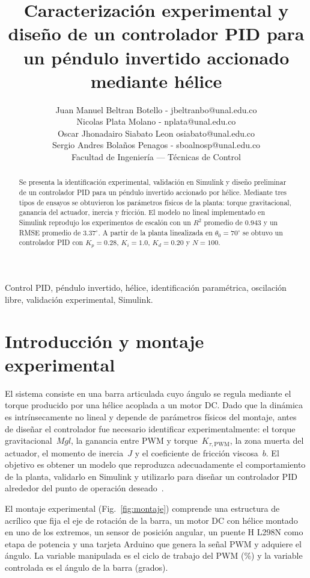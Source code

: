 \documentclass[journal, 10pt, twocolumn]{IEEEtran}
\title{Caracterización experimental y diseño de un controlador PID para
       un péndulo invertido accionado mediante hélice}
\author{Juan Manuel Beltran Botello - jbeltranbo@unal.edu.co\\
		Nicolas Plata Molano - nplata@unal.edu.co\\
		Oscar Jhonadairo Siabato Leon osiabato@unal.edu.co\\
	    Sergio Andres Bolaños Penagos - sboalnosp@unal.edu.co\\
        Facultad de Ingeniería --- Técnicas de Control}
\begin{document}
\maketitle

\begin{abstract}
Se presenta la identificación experimental, validación en Simulink y diseño
preliminar de un controlador PID para un péndulo invertido accionado por
hélice. Mediante tres tipos de ensayos se obtuvieron los parámetros físicos
de la planta: torque gravitacional, ganancia del actuador, inercia y fricción.
El modelo no lineal implementado en Simulink reprodujo los experimentos de
escalón con un $R^2$ promedio de $0.943$ y un RMSE promedio de $3.37^\circ$.
A partir de la planta linealizada en $\theta_0=70^\circ$ se obtuvo un
controlador PID con $K_p=0.28$, $K_i=1.0$, $K_d=0.20$ y $N=100$.
\end{abstract}

\begin{IEEEkeywords}
Control PID, péndulo invertido, hélice, identificación paramétrica,
oscilación libre, validación experimental, Simulink.
\end{IEEEkeywords}

\section{Introducción y montaje experimental}

El sistema consiste en una barra articulada cuyo ángulo se regula mediante
el torque producido por una hélice acoplada a un motor DC. Dado que la
dinámica es intrínsecamente no lineal y depende de parámetros físicos del
montaje, antes de diseñar el controlador fue necesario identificar
experimentalmente: el torque gravitacional~$Mgl$, la ganancia entre PWM y
torque~$K_{\tau,\mathrm{PWM}}$, la zona muerta del actuador, el momento de
inercia~$J$ y el coeficiente de fricción viscosa~$b$. El objetivo es
obtener un modelo que reproduzca adecuadamente el comportamiento de la
planta, validarlo en Simulink y utilizarlo para diseñar un controlador PID
alrededor del punto de operación deseado~\cite{ogata,astrom}.

El montaje experimental (Fig.~\ref{fig:montaje}) comprende una estructura
de acrílico que fija el eje de rotación de la barra, un motor DC con hélice
montado en uno de los extremos, un sensor de posición angular, un puente H
L298N como etapa de potencia y una tarjeta Arduino que genera la señal PWM
y adquiere el ángulo. La variable manipulada es el ciclo de trabajo del PWM
(\%) y la variable controlada es el ángulo de la barra (grados).
\end{document}
